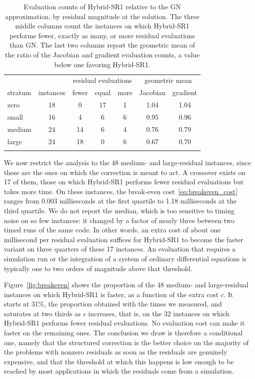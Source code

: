\documentclass[pdflatex,sn-mathphys-num]{sn-jnl}%
\theoremstyle{thmstyleone}%
\begin{document}
\begin{table}[htbp]
	\centering
	\caption{Evaluation counts of Hybrid-SR1 relative to the GN approximation, by residual magnitude at the solution. The three middle columns count the instances on which Hybrid-SR1 performs fewer, exactly as many, or more residual evaluations than GN. The last two columns report the geometric mean of the ratio of the Jacobian and gradient evaluation counts, a value below one favoring Hybrid-SR1.}\label{tab:evaluation_ratios}
	\begin{tabular}{lcccccc}
		\toprule
		& & \multicolumn{3}{c}{residual evaluations} & \multicolumn{2}{c}{geometric mean} \\
		stratum & instances & fewer & equal & more & Jacobian & gradient \\
		\midrule 
		zero   & 18 &  0 & 17 & 1 & 1.04 & 1.04 \\
		small  & 16 &  4 &  6 & 6 & 0.95 & 0.96 \\
		medium & 24 & 14 &  6 & 4 & 0.76 & 0.79 \\
		large  & 24 & 18 &  0 & 6 & 0.67 & 0.70 \\
		\botrule
	\end{tabular}

\end{table}

We now restrict the analysis to the 48 medium- and large-residual instances, since these are the ones on which the correction is meant to act. A crossover exists on 17 of them, those on which Hybrid-SR1 performs fewer residual evaluations but takes more time. On these instances, the break-even cost~\eqref{eq:breakeven_cost} ranges from 0.003 milliseconds at the first quartile to 1.18 milliseconds at the third quartile. We do not report the median, which is too sensitive to timing noise on so few instances: it changed by a factor of nearly three between two timed runs of the same code. In other words, an extra cost of about one millisecond per residual evaluation suffices for Hybrid-SR1 to become the faster variant on three quarters of these 17 instances. An evaluation that requires a simulation run or the integration of a system of ordinary differential equations is typically one to two orders of magnitude above that threshold.

Figure~\ref{fig:breakeven} shows the proportion of the 48 medium- and large-residual instances on which Hybrid-SR1 is faster, as a function of the extra cost $c$. It starts at 31\%, the proportion obtained with the times we measured, and saturates at two thirds as $c$ increases, that is, on the 32 instances on which Hybrid-SR1 performs fewer residual evaluations. No evaluation cost can make it faster on the remaining ones. The conclusion we draw is therefore a conditional one, namely that the structured correction is the better choice on the majority of the problems with nonzero residuals as soon as the residuals are genuinely expensive, and that the threshold at which this happens is low enough to be reached by most applications in which the residuals come from a simulation.
\end{document}
